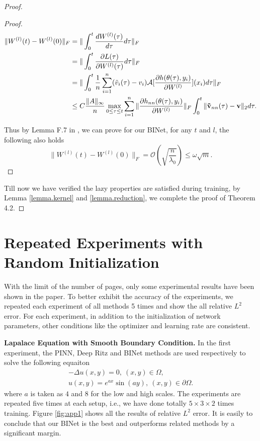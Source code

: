 \documentclass[hyperref]{article}
\numberwithin{equation}{section}
\theoremstyle{nonumberplain}
\newtheorem{proof}{Proof}
\begin{document}
\begin{proof}
		\begin{proof}
			\begin{align}
				\begin{split}
					\|W^{(l)}(t)-W^{(l)}(0)\|_F &= \|\int_0^t\frac{dW^{(l)}(\tau)}{d\tau}d\tau\|_F\\
					&= \|\int_0^t\frac{\partial L(\tau)}{\partial W^{(l)}(\tau)}d\tau\|_F\\
					&= \|\int_0^t\frac{1}{n}\sum_{i=1}^n(\tilde{v}_i(\tau)-v_i)\mathcal{A}[\frac{\partial h(\theta(\tau),y_i)}{\partial W^{(l)}} ](x_i) d\tau\|_F\\
					& \leq C\frac{\|A\|_\infty}{n}\max_{0\leq\tau\leq t}\sum_{i=1}^n\|\frac{\partial h_{nn}(\theta(\tau),y_i)}{\partial W^{(l)}}\|_F\int_0^t\|{\bf \tilde{v}}_{nn}(\tau)-{\bf v}\|_2d\tau.
				\end{split}
			\end{align}
			
			Thus by Lemma F.7 in \cite{arora2019exact}, we can prove for our BINet, for any $t$ and $l$, the following also holds
			\begin{equation}
				\|W^{(l)}(t)-W^{(l)}(0)\|_F = \mathcal{O}(\sqrt{\frac{n}{\lambda_0}}) \leq \omega\sqrt{m}. 
			\end{equation}
		\end{proof}
		
		
		Till now we have verified the lazy properties are satisfied during training, by Lemma \ref{lemma.kernel} and \ref{lemma.reduction}, we complete the proof of Theorem 4.2.
		
	\end{proof} 
	
	
	
	
	\section{Repeated Experiments with Random Initialization}
	With the limit of the number of pages, only some experimental results have been shown in the paper. To better exhibit the accuracy of the experiments, we repeated each experiment of all methods 5 times and show the all relative $L^2$ error. For each experiment, in addition to the initialization of network parameters, other conditions like the optimizer and learning rate are consistent. 
	
	\textbf{Lapalace Equation with Smooth Boundary Condition.}
	In the first experiment, the PINN, Deep Ritz and BINet methods are used respectively to solve the following equaiton
	\begin{equation}
		\begin{aligned}
			-\Delta u(x,y) = 0, \ (x,y)\in\Omega,\\
			u(x,y) = e^{ax}\sin(ay), \ (x,y)\in\partial\Omega.
		\end{aligned}
		\label{Ex1_eq_app}
	\end{equation}
	where $a$ is taken as $4$ and $8$ for the low and high scales.
	The experiments are repeated five times at each setup, i.e., we have done totally $5\times 3\times 2$ times training. Figure \ref{fig:app1} shows all the results of relative $L^2$ error. It is easily to conclude that our BINet is the best and outperforms related methods by a significant margin.
	
\end{document}
